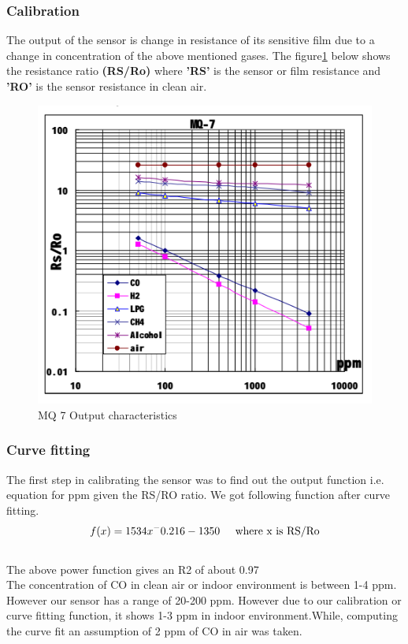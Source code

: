 \documentclass[a4paper,12pt]{article}
\begin{document}
\subsubsection{Calibration}
The output of the sensor is change in resistance of its sensitive film due to a change in concentration of the above mentioned gases. The figure\ref{fig:temp1} below shows the resistance ratio \textbf{(RS/Ro)}
% 
% 
% 
% 
where \textbf{'RS'} is the sensor or film resistance and \textbf{'RO'} is the sensor resistance in clean air.
\begin{figure} [!ht]
\centering
\includegraphics[scale=0.5]{MQ_7.png}
\caption{MQ 7 Output characteristics}
\label{fig:temp1}
\end{figure}
\subsubsection{Curve fitting}
The first step in calibrating the sensor was to find out the output function i.e. equation for ppm given the RS/RO ratio. We got following function after curve fitting.
\begin{equation}
f(x) = 1534x^-0.216 - 1350
\hspace{0.5cm} \textnormal{where x is RS/Ro}
% 
% 
% 
\end{equation}
\\The above power function gives an R2 of about 0.97
\\
 The concentration of CO in clean air or indoor environment is between 1-4 ppm. However our sensor has a range of 20-200 ppm. However due to our calibration or curve fitting function, it shows 1-3 ppm in indoor environment.While, computing the curve fit an assumption of 2 ppm of CO in air was taken.
\end{document}
